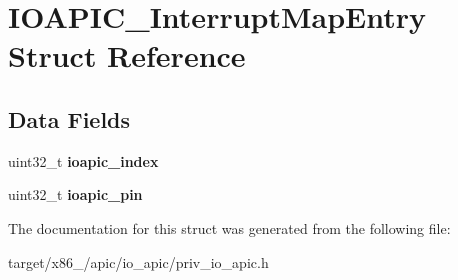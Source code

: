 \hypertarget{structIOAPIC__InterruptMapEntry}{}\section{I\+O\+A\+P\+I\+C\+\_\+\+Interrupt\+Map\+Entry Struct Reference}
\label{structIOAPIC__InterruptMapEntry}
\subsection*{Data Fields}
\begin{DoxyCompactItemize}
\item 
uint32\+\_\+t {\bfseries ioapic\+\_\+index}\hypertarget{structIOAPIC__InterruptMapEntry_a8999fab3a298175a8973a088aa6bff48}{}\label{structIOAPIC__InterruptMapEntry_a8999fab3a298175a8973a088aa6bff48}

\item 
uint32\+\_\+t {\bfseries ioapic\+\_\+pin}\hypertarget{structIOAPIC__InterruptMapEntry_ab8884a7b77f3610b87a3da007e7c524d}{}\label{structIOAPIC__InterruptMapEntry_ab8884a7b77f3610b87a3da007e7c524d}

\end{DoxyCompactItemize}


The documentation for this struct was generated from the following file\+:\begin{DoxyCompactItemize}
\item 
target/x86\+\_/apic/io\+\_\+apic/priv\+\_\+io\+\_\+apic.\+h\end{DoxyCompactItemize}
